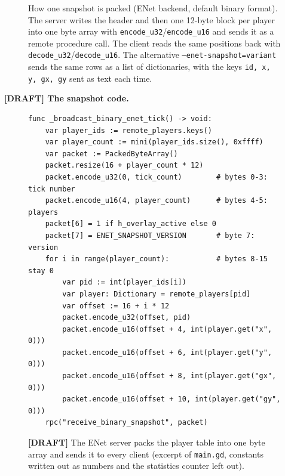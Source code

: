 \documentclass[11pt]{article}
\begin{document}
\begin{figure}[H]
\caption{How one snapshot is packed (ENet backend, default binary format). The server writes the header and then one 12-byte block per player into one byte array with \texttt{encode\_u32}/\texttt{encode\_u16} and sends it as a remote procedure call. The client reads the same positions back with \texttt{decode\_u32}/\texttt{decode\_u16}. The alternative \texttt{--enet-snapshot=variant} sends the same rows as a list of dictionaries, with the keys \texttt{id, x, y, gx, gy} sent as text each time.}
\end{figure}

\newcommand{\draftmark}{\textcolor{red!70!black}{\textbf{[DRAFT]}}}

\noindent\textbf{\draftmark{} The snapshot code.}\par\nobreak
\begin{figure}[H]
\begin{lstlisting}[basicstyle=\ttfamily\scriptsize]
func _broadcast_binary_enet_tick() -> void:
    var player_ids := remote_players.keys()
    var player_count := mini(player_ids.size(), 0xffff)
    var packet := PackedByteArray()
    packet.resize(16 + player_count * 12)
    packet.encode_u32(0, tick_count)        # bytes 0-3: tick number
    packet.encode_u16(4, player_count)      # bytes 4-5: players
    packet[6] = 1 if h_overlay_active else 0
    packet[7] = ENET_SNAPSHOT_VERSION       # byte 7: version
    for i in range(player_count):           # bytes 8-15 stay 0
        var pid := int(player_ids[i])
        var player: Dictionary = remote_players[pid]
        var offset := 16 + i * 12
        packet.encode_u32(offset, pid)
        packet.encode_u16(offset + 4, int(player.get("x", 0)))
        packet.encode_u16(offset + 6, int(player.get("y", 0)))
        packet.encode_u16(offset + 8, int(player.get("gx", 0)))
        packet.encode_u16(offset + 10, int(player.get("gy", 0)))
    rpc("receive_binary_snapshot", packet)
\end{lstlisting}
\caption{\draftmark{} The ENet server packs the player table into one byte array and sends it to every client (excerpt of \texttt{main.gd}, constants written out as numbers and the statistics counter left out).}
\end{figure}
\end{document}
